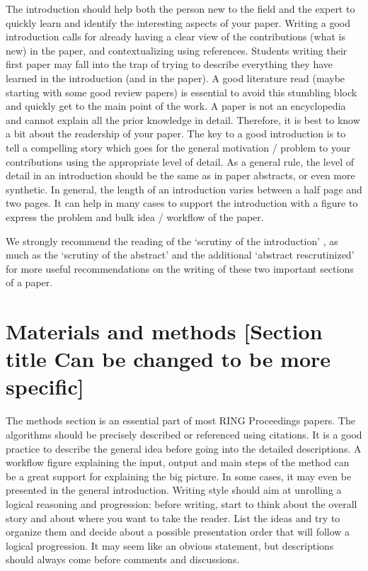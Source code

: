 \documentclass[final]{ring}
\begin{document}
The introduction should help both the person new to the field and the expert to quickly learn and identify the interesting aspects of your paper. Writing a good introduction calls for already having a clear view of the contributions (what is new) in the paper, and contextualizing using references. Students writing their first paper may fall into the trap of trying to describe everything they have learned in the introduction (and in the paper). A good literature read (maybe starting with some good review papers) is essential to avoid this stumbling block and quickly get to the main point of the work. A paper is not an encyclopedia and cannot explain all the prior knowledge in detail. Therefore, it is best to know a bit about the readership of your paper. The key to a good introduction is to tell a compelling story which goes for the general motivation / problem to your contributions using the appropriate level of detail. As a general rule, the level of detail in an introduction should be the same as in paper abstracts, or even more synthetic. In general, the length of an introduction varies between a half page and two pages. It can help in many cases to support the introduction with a figure to express the problem and bulk idea / workflow of the paper. 

We strongly recommend the reading of the `scrutiny of the introduction' \citep{Claerbout1988S}, as much as the `scrutiny of the abstract' \citep{Landes1966BAAPG} and the additional `abstract rescrutinized' \citep{Lowman1998G} for more useful recommendations on the writing of these two important sections of a paper. 

\section{Materials and methods [Section title Can be changed to be more specific]}
\label{Method}

The methods section is an essential part of most RING Proceedings papers. The algorithms should be precisely described or referenced using citations. It is a good practice to describe the general idea before going into the detailed descriptions. A workflow figure explaining the input, output and main steps of the method can be a great support for explaining the big picture. In some cases, it may even be presented in the general introduction. 
Writing style should aim at unrolling a logical reasoning and progression: before writing, start to think about the overall story and about where you want to take the reader. List the ideas and try to organize them and decide about a possible presentation order that will follow a logical progression. It may seem like an obvious statement, but descriptions should always come before comments and discussions. 
\end{document}
